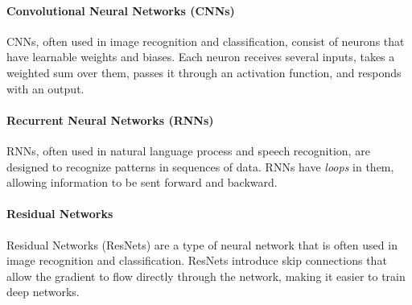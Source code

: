 \documentclass[oneside,11pt,dvipsnames]{book}
\begin{document}
\paragraph{Convolutional Neural Networks (CNNs)} CNNs, often used in image recognition and classification, consist of neurons that have learnable weights and biases. Each neuron receives several inputs, takes a weighted sum over them, passes it through an activation function, and responds with an output.

\paragraph{Recurrent Neural Networks (RNNs)} RNNs, often used in natural language process and speech recognition, are designed to recognize patterns in sequences of data. RNNs have \emph{loops} in them, allowing information to be sent forward and backward.

\paragraph{Residual Networks} Residual Networks (ResNets) are a type of neural network that is often used in image recognition and classification. ResNets introduce skip connections that allow the gradient to flow directly through the network, making it easier to train deep networks.



\end{document}
